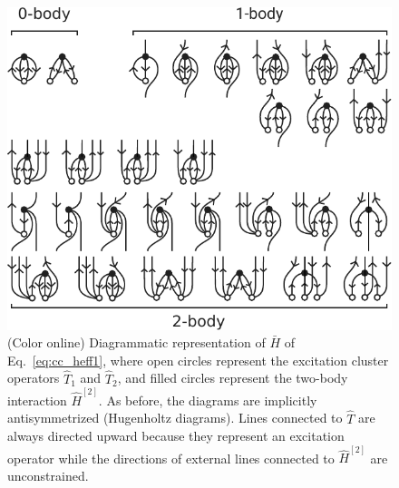 \begin{figure}
  \includegraphics{fig-diagrams-ccsd.pdf}
  \caption{(Color online) Diagrammatic representation of $\bar{H}$ of Eq.\ \eqref{eq:cc_heff1}, where open circles represent the excitation cluster operators $\hat{T}_1$ and $\hat{T}_2$, and filled circles represent the two-body interaction $\hat{H}^{[2]}$.  As before, the diagrams are implicitly antisymmetrized (Hugenholtz diagrams).  Lines connected to $\hat{T}$ are always directed upward because they represent an excitation operator while the directions of external lines connected to $\hat{H}^{[2]}$ are unconstrained.}
  \label{fig:diagrams-ccsd}
\end{figure}


